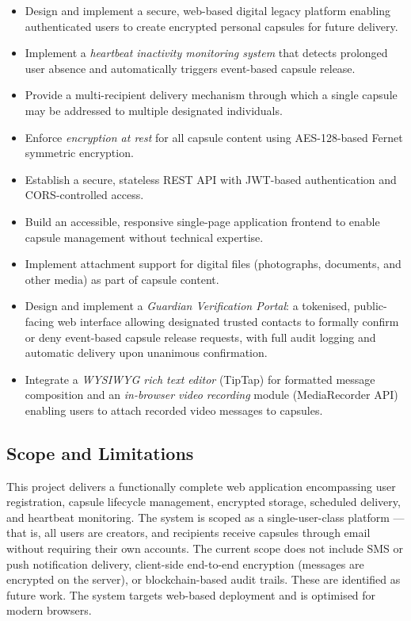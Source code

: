 \documentclass[12pt, a4paper]{article}
\begin{document}
\begin{itemize}
  \item Design and implement a secure, web-based digital legacy platform enabling authenticated users to create encrypted personal capsules for future delivery.
  \item Implement a \textit{heartbeat inactivity monitoring system} that detects prolonged user absence and automatically triggers event-based capsule release.
  \item Provide a multi-recipient delivery mechanism through which a single capsule may be addressed to multiple designated individuals.
  \item Enforce \textit{encryption at rest} for all capsule content using AES-128-based Fernet symmetric encryption.
  \item Establish a secure, stateless REST API with JWT-based authentication and CORS-controlled access.
  \item Build an accessible, responsive single-page application frontend to enable capsule management without technical expertise.
  \item Implement attachment support for digital files (photographs, documents, and other media) as part of capsule content.
  \item Design and implement a \textit{Guardian Verification Portal}: a tokenised, public-facing web interface allowing designated trusted contacts to formally confirm or deny event-based capsule release requests, with full audit logging and automatic delivery upon unanimous confirmation.
  \item Integrate a \textit{WYSIWYG rich text editor} (TipTap) for formatted message composition and an \textit{in-browser video recording} module (MediaRecorder API) enabling users to attach recorded video messages to capsules.
\end{itemize}

\subsection{Scope and Limitations}

This project delivers a functionally complete web application encompassing user registration, capsule lifecycle management, encrypted storage, scheduled delivery, and heartbeat monitoring. The system is scoped as a single-user-class platform — that is, all users are creators, and recipients receive capsules through email without requiring their own accounts. The current scope does not include SMS or push notification delivery, client-side end-to-end encryption (messages are encrypted on the server), or blockchain-based audit trails. These are identified as future work. The system targets web-based deployment and is optimised for modern browsers.
\end{document}
